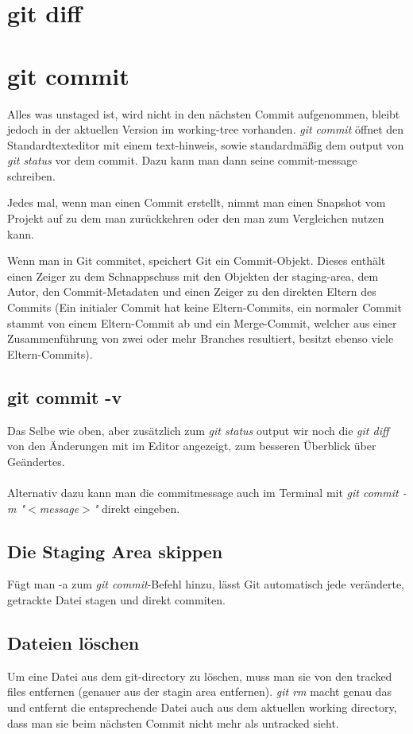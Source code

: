 \documentclass{article}
\begin{document}
\section*{git diff}

\section*{git commit}

Alles was unstaged ist, wird nicht in den nächsten Commit aufgenommen, bleibt jedoch in der aktuellen Version im working-tree vorhanden.
\textit{git commit} öffnet den Standardtexteditor mit einem text-hinweis, sowie standardmäßig dem output von \textit{git status} vor dem commit. Dazu kann man dann seine commit-message schreiben.

Jedes mal, wenn man einen Commit erstellt, nimmt man einen Snapshot vom Projekt auf zu dem man zurückkehren oder den man zum Vergleichen nutzen kann.

Wenn man in Git commitet, speichert Git ein Commit-Objekt. Dieses enthält einen Zeiger zu dem Schnappschuss mit den Objekten der staging-area, dem Autor, den Commit-Metadaten und einen Zeiger zu den direkten Eltern des Commits (Ein initialer Commit hat keine Eltern-Commits, ein normaler Commit stammt von einem Eltern-Commit ab und ein Merge-Commit, welcher aus einer Zusammenführung von zwei oder mehr Branches resultiert, besitzt ebenso viele Eltern-Commits).

\subsection*{git commit -v}
Das Selbe wie oben, aber zusätzlich zum \textit{git status} output wir noch die \textit{git diff} von den Änderungen mit im Editor angezeigt, zum besseren Überblick über Geändertes. \\\\
Alternativ dazu kann man die commitmessage auch im Terminal mit \textit{git commit -m "$<$message$>$"} direkt eingeben.

\subsection*{Die Staging Area skippen}
Fügt man -a zum \textit{git commit}-Befehl hinzu, lässt Git automatisch jede veränderte, getrackte Datei stagen und direkt commiten.

\subsection*{Dateien löschen}
Um eine Datei aus dem git-directory zu löschen, muss man sie von den tracked files entfernen (genauer aus der stagin area entfernen). \textit{git rm} macht genau das und entfernt die entsprechende Datei auch aus dem aktuellen working directory, dass man sie beim nächsten Commit nicht mehr als untracked sieht.
\end{document}

